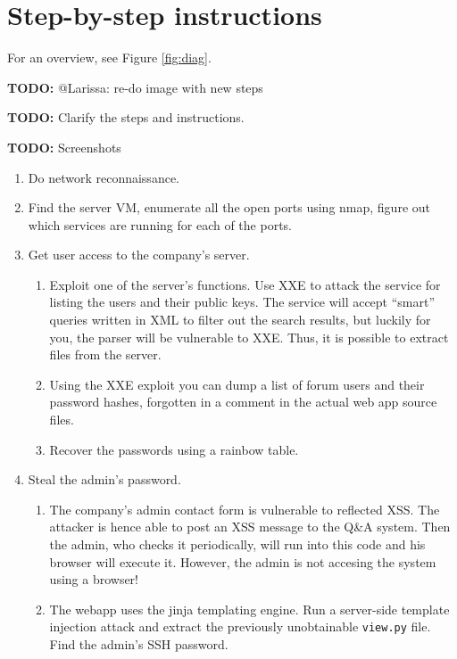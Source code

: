 \documentclass[a4paper]{article}
\newcommand{\TODO}[1]{\begin{center}\large\textbf{TODO:} #1\end{center}}
\begin{document}
\section{Step-by-step instructions}

For an overview, see Figure \ref{fig:diag}.
\TODO{@Larissa: re-do image with new steps}

\TODO{Clarify the steps and instructions.}
\TODO{Screenshots}

\begin{enumerate}
  \item Do network reconnaissance.
  \item Find the server VM, enumerate all the open ports using nmap, figure
        out which services are running for each of the ports.
  \item Get user access to the company's server.
        \begin{enumerate}
          \item Exploit one of the server's functions.
              Use XXE to attack the service for listing the users and their public keys.
                The service will accept ``smart'' queries written in XML to filter out
                the search results, but luckily for you, the parser will be
                vulnerable to XXE. Thus, it is possible to extract files
                from the server.
          \item Using the XXE exploit you can dump a list of
                forum users and their password hashes, forgotten in a comment
                in the actual web app source files.
          \item Recover the passwords using a rainbow table.
        \end{enumerate}

  \item Steal the admin's password.
        \begin{enumerate}
          \item The company's admin contact form is vulnerable to reflected XSS. The attacker is
              hence able to post an XSS message to the Q\&A system. Then the admin, who
                checks it periodically, will run into this code and his browser
                will execute it. However, the admin is not accesing the system using a browser!
          \item The webapp uses the jinja templating engine. Run a server-side template
              injection attack and extract the previously unobtainable \texttt{view.py} file.
              Find the admin's SSH password.
        \end{enumerate}


\end{enumerate}
\end{document}
